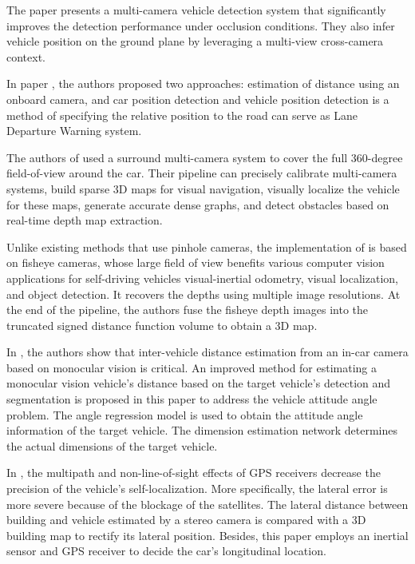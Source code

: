 The paper \cite{Wu2019} presents a multi-camera vehicle detection system that significantly improves the detection performance under occlusion conditions. They also infer vehicle position on the ground plane by leveraging a multi-view cross-camera context.

In paper \cite{Ali2016}, the authors proposed two approaches: estimation of distance using an onboard camera, and car position detection and vehicle position detection is a method of specifying the relative position to the road can serve as Lane Departure Warning system. 

The authors of \cite{Hane2017} used a surround multi-camera system to cover the full 360-degree field-of-view around the car. Their pipeline can precisely calibrate multi-camera systems, build sparse 3D maps for visual navigation, visually localize the vehicle for these maps, generate accurate dense graphs, and detect obstacles based on real-time depth map extraction.

Unlike existing methods that use pinhole cameras, the implementation of \cite{Cui2019} is based on fisheye cameras, whose large field of view benefits various computer vision applications for self-driving vehicles visual-inertial odometry, visual localization, and object detection. It recovers the depths using multiple image resolutions. At the end of the pipeline, the authors fuse the fisheye depth images into the truncated signed distance function volume to obtain a 3D map.

In \cite{Huang2019}, the authors show that inter-vehicle distance estimation from an in-car camera based on monocular vision is critical.  An improved method for estimating a monocular vision vehicle's distance based on the target vehicle's detection and segmentation is proposed in this paper to address the vehicle attitude angle problem. The angle regression model is used to obtain the attitude angle information of the target vehicle. The dimension estimation network determines the actual dimensions of the target vehicle.

In \cite{Bao2016}, the multipath and non-line-of-sight effects of GPS receivers decrease the precision of the vehicle's self-localization. More specifically, the lateral error is more severe because of the blockage of the satellites. The lateral distance between building and vehicle estimated by a stereo camera is compared with a 3D building map to rectify its lateral position. Besides, this paper employs an inertial sensor and GPS receiver to decide the car's longitudinal location.

